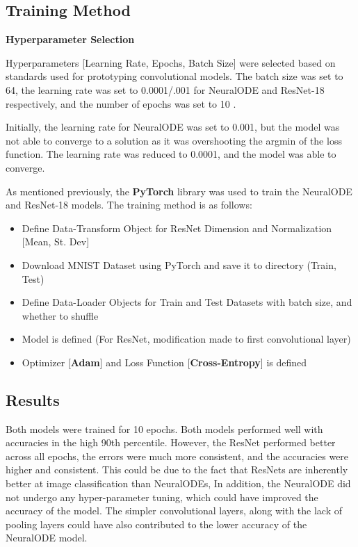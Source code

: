 \documentclass{article}
\begin{document}
\pagebreak

\subsection{Training Method}

\textbf{Hyperparameter Selection}

Hyperparameters [Learning Rate, Epochs, Batch Size] were selected based on standards used for prototyping
convolutional models. The batch size was set to 64, the learning rate was set to 0.0001/.001 for NeuralODE and ResNet-18
respectively, and the number of epochs was set to 10 \cite{19Stoyanov}. 

Initially, the learning rate for NeuralODE was set to 0.001, but the model was not able to converge to a solution
as it was overshooting the argmin of the loss function. The learning rate was reduced to 0.0001, and the model was
able to converge.

As mentioned previously, the \textbf{PyTorch} library was used to train the NeuralODE and ResNet-18 models.
The training method is as follows:
\begin{itemize}
   \item Define Data-Transform Object for ResNet Dimension and Normalization [Mean, St. Dev]
   \item Download MNIST Dataset using PyTorch and save it to directory (Train, Test)
   \item Define Data-Loader Objects for Train and Test Datasets with batch size, and whether to shuffle
   \item Model is defined (For ResNet, modification made to first convolutional layer)
   \item Optimizer [\textbf{Adam}] and Loss Function [\textbf{Cross-Entropy}] is defined
\end{itemize}

\subsection{Results}

Both models were trained for 10 epochs. Both models performed well with accuracies in the high 90th percentile. However,
the ResNet performed better across all epochs, the errors were much more consistent, and the accuracies were higher and consistent.
This could be due to the fact that ResNets are inherently better at image classification than NeuralODEs, In addition, the NeuralODE
did not undergo any hyper-parameter tuning, which could have improved the accuracy of the model. The simpler convolutional layers, along
with the lack of pooling layers could have also contributed to the lower accuracy of the NeuralODE model.
\end{document}

